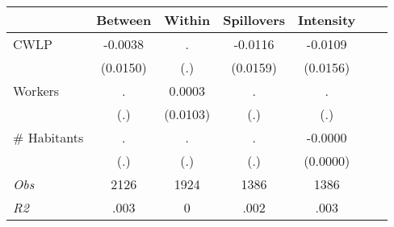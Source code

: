 \begin{tabular}{l*{6}{c}}\hline&\multicolumn{1}{c}{Between}&\multicolumn{1}{c}{Within}&\multicolumn{1}{c}{Spillovers}&\multicolumn{1}{c}{Intensity}\\ \hline 
CWLP & -0.0038 & . & -0.0116 & -0.0109 \\
 & (0.0150) & (.) & (0.0159) & (0.0156) \\
Workers & . & 0.0003 & . & . \\
 & (.) & (0.0103) & (.) & (.) \\
\# Habitants & . & . & . & -0.0000 \\
  & (.) & (.) & (.) & (0.0000) \\
\hline \textit{Obs} & 2126 & 1924 & 1386 & 1386  \\ \textit{R2} & .003 & 0 & .002 & .003 \\ \hline \end{tabular}
